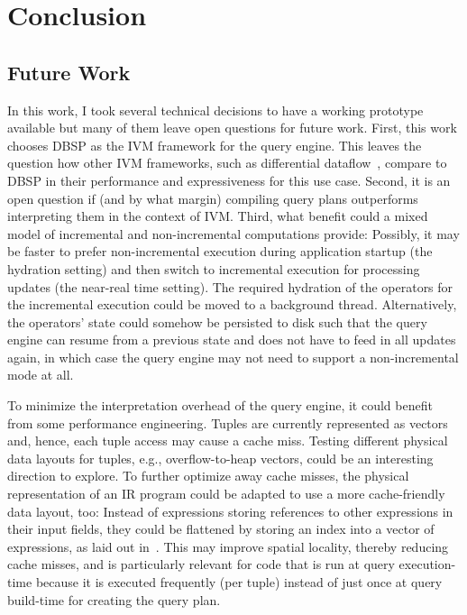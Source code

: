
\chapter{Conclusion}\label{ch:conclusion}

\section{Future Work}\label{sec:future-work}

In this work, I took several technical decisions to have a working prototype
available but many of them leave open questions for future work.
First, this work chooses DBSP as the \ac{IVM} framework for the query engine.
This leaves the question how other \ac{IVM} frameworks, such as differential
dataflow~\cite{mcsherry2013differential}, compare to DBSP in their performance
and expressiveness for this use case.
Second, it is an open question if (and by what margin) compiling query plans
outperforms interpreting them in the context of \ac{IVM}.
Third, what benefit could a mixed model of incremental and non-incremental
computations provide:
Possibly, it may be faster to prefer non-incremental execution during application
startup (the hydration setting) and then switch to incremental execution for
processing updates (the near-real time setting).
The required hydration of the operators for the incremental execution could be
moved to a background thread.
Alternatively, the operators' state could somehow be persisted to disk such that
the query engine can resume from a previous state and does not have to
feed in all updates again, in which case the query engine may not need
to support a non-incremental mode at all.

To minimize the interpretation overhead of the query engine, it could
benefit from some performance engineering.
Tuples are currently represented as vectors and, hence, each tuple access
may cause a cache miss.
Testing different physical data layouts for tuples, e.g., overflow-to-heap
vectors\footnotemark{}, could be an interesting direction to explore.
To further optimize away cache misses, the physical representation of an
\ac{IR} program could be adapted to use a more cache-friendly data layout, too:
Instead of expressions storing references to other expressions in their
input fields, they could be flattened by storing an index into a vector of
expressions, as laid out in~\cite{sampson2023flattening}.
This may improve spatial locality, thereby reducing cache misses, and is
particularly relevant for code that is run at query execution-time because
it is executed frequently (per tuple) instead of just once at query build-time
for creating the query plan.

